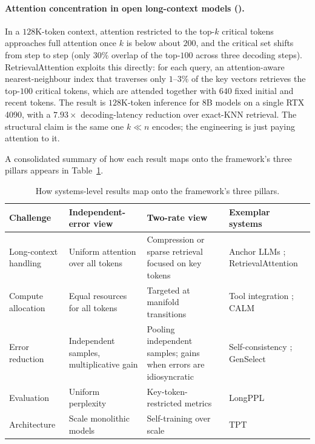 \paragraph{Attention concentration in open long-context models (\citet{liu2024retrieval}).}
In a $128$K-token context, attention restricted to the top-$k$ critical tokens approaches full attention once $k$ is below about $200$, and the critical set shifts from step to step (only $30\%$ overlap of the top-$100$ across three decoding steps). RetrievalAttention exploits this directly: for each query, an attention-aware nearest-neighbour index that traverses only $1$--$3\%$ of the key vectors retrieves the top-$100$ critical tokens, which are attended together with $640$ fixed initial and recent tokens. The result is $128$K-token inference for 8B models on a single RTX 4090, with a $7.93\times$ decoding-latency reduction over exact-KNN retrieval. The structural claim is the same one $k \ll n$ encodes; the engineering is just paying attention to it.

A consolidated summary of how each result maps onto the framework's three pillars appears in Table~\ref{tab:implications}.

\begin{table}[ht]
\caption{How systems-level results map onto the framework's three pillars.}
\label{tab:implications}
\centering
\small
\begin{tabular}{p{2.6cm}p{3cm}p{3cm}p{3.5cm}}
\toprule
\textbf{Challenge} & \textbf{Independent-error view} & \textbf{Two-rate view} & \textbf{Exemplar systems} \\
\midrule
Long-context handling & Uniform attention over all tokens & Compression or sparse retrieval focused on key tokens & Anchor LLMs \citep{pang2024anchor}; RetrievalAttention \citep{liu2024retrieval} \\
\midrule
Compute allocation & Equal resources for all tokens & Targeted at manifold transitions & Tool integration \citep{moshkov2025aimo}; CALM \citep{schuster2022calm} \\
\midrule
Error reduction & Independent samples, multiplicative gain & Pooling independent samples; gains when errors are idiosyncratic & Self-consistency \citep{wang2023self}; GenSelect \citep{moshkov2025aimo} \\
\midrule
Evaluation & Uniform perplexity & Key-token-restricted metrics & LongPPL \citep{fang2024what} \\
\midrule
Architecture & Scale monolithic models & Self-training over scale & TPT \citep{costello2025think} \\
\bottomrule
\end{tabular}
\end{table}

